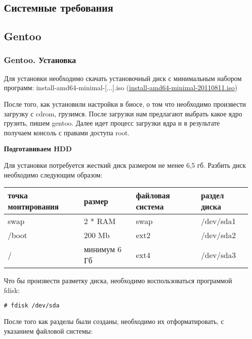 \documentclass[12pt, a4paper]{article}
\begin{document}
\subsection{Системные требования}
\subsection{Gentoo}

\subsubsection{Gentoo. Установка}

Для установки необходимо скачать установочный диск с минимальным набором программ: 
install-amd64-minimal-[...].iso
(\href{http://mirror.yandex.ru/gentoo-distfiles/releases/amd64/current-iso/install-amd64-minimal-20110811.iso}{install-amd64-minimal-20110811.iso})

После того, как установили настройки в биосе, о том что необходимо произвести загрузку с cdrom, грузимся. После загрузки нам предлагают выбрать какое ядро грузить, пишем gentoo. Далее идет процесс загрузки ядра и в результате получаем консоль с правами доступа root.


{\bf Подготавиваем HDD}

Для установки потребуется жесткий диск размером не менее 6,5 гб. Разбить диск необходимо следующим образом:

\begin{center}
\begin{tabular}{|l|l|l|l|}
\hline точка монтирования  & размер & файловая система & раздел диска \\
\hline swap  & 2 * RAM & swap & /dev/sda1 \\
\hline /boot & 200 Mb & ext2  & /dev/sda2 \\
\hline / & минимум 6 Гб & ext4 & /dev/sda3 \\
\hline
\end{tabular}
\end{center}

Что бы произвести разметку диска, необходимо воспользоваться программой fdisk:

\begin{verbatim}
# fdisk /dev/sda
\end{verbatim}


После того как разделы были созданы, необходимо их отформатировать, с указанием файловой системы:
\end{document}
